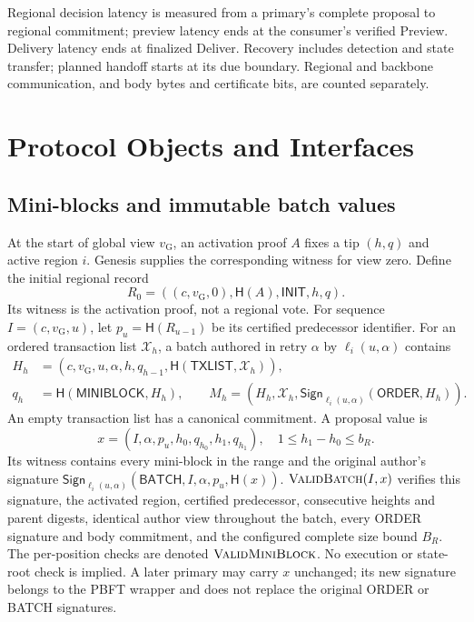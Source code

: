 \documentclass[11pt,a4paper,onecolumn]{article}
\newcommand{\Hash}{\mathsf H}
\newcommand{\Sig}{\mathsf{Sign}}
\newcommand{\gv}{v_{\mathrm G}}
\newcommand{\Tag}[1]{\mathsf{#1}}
\newcommand{\Proc}[1]{\textnormal{\textsc{#1}}}
\theoremstyle{remark}\newtheorem{example}[definition]{Example}
\begin{document}
Regional decision latency is measured from a primary's complete proposal to
regional commitment; preview latency ends at the consumer's verified Preview.
Delivery latency ends at finalized Deliver. Recovery includes detection and
state transfer; planned handoff starts at its due boundary. Regional and
backbone communication, and body bytes and certificate bits, are counted
separately.

\section{Protocol Objects and Interfaces}\label{sec:objects}

\subsection{Mini-blocks and immutable batch values}
At the start of global view $\gv$, an activation proof $A$ fixes a tip $(h,q)$
and active region $i$. Genesis supplies the corresponding witness for view zero.
Define the initial regional record
\[
 R_0=((c,\gv,0),\Hash(A),\Tag{INIT},h,q).
\]
Its witness is the activation proof, not a regional vote. For sequence
$I=(c,\gv,u)$, let $p_u=\Hash(R_{u-1})$ be its certified predecessor identifier.
For an ordered transaction list $\mathcal X_h$, a batch authored in retry
$\alpha$ by $\ell_i(u,\alpha)$ contains
\begin{align}
 H_h&=(c,\gv,u,\alpha,h,q_{h-1},\Hash(\Tag{TXLIST},\mathcal X_h)),\label{eq:block}\\
 q_h&=\Hash(\Tag{MINIBLOCK},H_h),\qquad
 M_h=(H_h,\mathcal X_h,\Sig_{\ell_i(u,\alpha)}(\Tag{ORDER},H_h)).\nonumber
\end{align}
An empty transaction list has a canonical commitment. A proposal value is
\begin{equation}\label{eq:proposal}
 x=(I,\alpha,p_u,h_0,q_{h_0},h_1,q_{h_1}),\quad 1\leq h_1-h_0\leq b_R.
\end{equation}
Its witness contains every mini-block in the range and the original author's
signature $\Sig_{\ell_i(u,\alpha)}(\Tag{BATCH},I,\alpha,p_u,\Hash(x))$.
$\Proc{ValidBatch}(I,x)$ verifies this signature, the activated region,
certified predecessor, consecutive heights and parent digests, identical author
view throughout the batch, every ORDER signature and body commitment, and the
configured complete size bound $B_R$. The per-position checks are denoted
$\Proc{ValidMiniBlock}$. No execution or state-root check is implied.
A later primary may carry $x$ unchanged; its new signature belongs to the PBFT
wrapper and does not replace the original ORDER or BATCH signatures.
\end{document}
